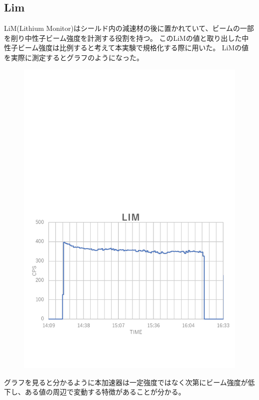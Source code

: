 \subsection{Lim}
LiM(Lithium Monitor)はシールド内の減速材の後に置かれていて、ビームの一部を削り中性子ビーム強度を計測する役割を持つ。
このLiMの値と取り出した中性子ビーム強度は比例すると考えて本実験で規格化する際に用いた。
LiMの値を実際に測定するとグラフのようになった。
\begin{figure}
\begin{center}
\includegraphics{accelerator/LiM.pdf}
\end{center}
\end{figure}
グラフを見ると分かるように本加速器は一定強度ではなく次第にビーム強度が低下し、ある値の周辺で変動する特徴があることが分かる。


